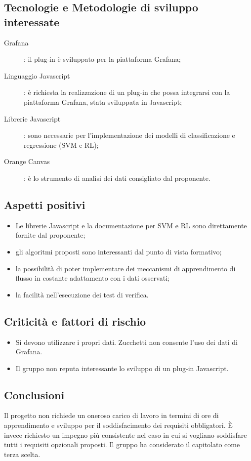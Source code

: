 \documentclass[../studio-di-fattibilita.tex]{subfiles}
\begin{document}
	
	\subsection{Tecnologie e Metodologie di sviluppo interessate}
	\label{subsec:tecnologie_interessate}
	\begin{description}
		\item [Grafana]: il plug-in è sviluppato per la piattaforma Grafana;
		\item [Linguaggio Javascript]: è richiesta la realizzazione di un plug-in che possa integrarsi con la piattaforma Grafana, stata sviluppata in Javascript;
		\item [Librerie Javascript]: sono necessarie per l'implementazione dei modelli di classificazione e regressione (SVM e RL);
		\item [Orange Canvas]: è lo strumento di analisi dei dati consigliato dal proponente.
	\end{description}


	\subsection{Aspetti positivi}
	\label{subsec:aspetti_positivi}
	\begin{itemize}
		\item Le librerie Javascript e la documentazione per SVM e RL sono direttamente fornite dal proponente;
		\item gli algoritmi proposti sono interessanti dal punto di vista formativo;
		\item la possibilità di poter implementare dei meccanismi di apprendimento di flusso in costante adattamento con i dati osservati;
		\item la facilità nell'esecuzione dei test di verifica.
	\end{itemize}


	\subsection{Criticità e fattori di rischio}
	\label{subsec:criticita_e_fattori_di_rischio}
	\begin{itemize}
		\item Si devono utilizzare i propri dati. Zucchetti non consente l'uso dei dati di Grafana.
		\item Il gruppo non reputa interessante lo sviluppo di un plug-in Javascript.
	\end{itemize}


	\subsection{Conclusioni}
	\label{subsec:conclusioni}
	Il progetto non richiede un oneroso carico di lavoro in termini di ore di apprendimento e sviluppo per il soddisfacimento dei requisiti obbligatori. È invece richiesto un impegno più consistente nel caso in cui si vogliano soddisfare tutti i requisiti opzionali proposti.
	Il gruppo ha considerato il capitolato come terza scelta.
\end{document}
